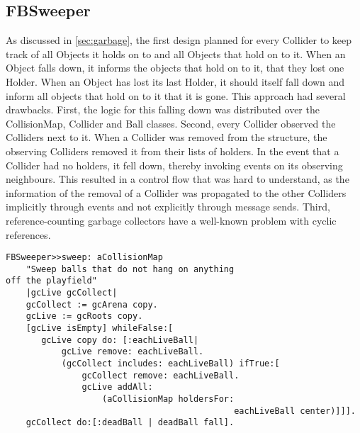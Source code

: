 \subsection{FBSweeper}
As discussed in \ref{sec:garbage}, the first design planned for every Collider to keep track of all Objects it holds on to and all Objects that hold on to it. When an Object falls down, it informs the objects that hold on to it, that they lost one Holder. When an Object has lost its last Holder, it should itself fall down and inform all objects that hold on to it that it is gone.
This approach had several drawbacks. First, the logic for this falling down was distributed over the CollisionMap, Collider and Ball classes.
Second, every Collider observed the Colliders next to it. When a Collider was removed from the structure, the observing Colliders removed it from their lists of holders. In the event that a Collider had no holders, it fell down, thereby invoking events on its observing neighbours.
This resulted in a control flow that was hard to understand, as the information of the removal of a Collider was propagated to the other Colliders implicitly through events and not explicitly through message sends.
Third, reference-counting garbage collectors have a well-known problem with cyclic references. 

\begin{lstlisting}[language=Smalltalk, label=lst:sweep, caption= mark-and-sweep ball collector]
FBSweeper>>sweep: aCollisionMap
    "Sweep balls that do not hang on anything 
off the playfield"
    |gcLive gcCollect|
    gcCollect := gcArena copy.
    gcLive := gcRoots copy.
    [gcLive isEmpty] whileFalse:[
       gcLive copy do: [:eachLiveBall|
           gcLive remove: eachLiveBall.
           (gcCollect includes: eachLiveBall) ifTrue:[
               gcCollect remove: eachLiveBall.
               gcLive addAll:
                   (aCollisionMap holdersFor: 
                                             eachLiveBall center)]]].
    gcCollect do:[:deadBall | deadBall fall].
\end{lstlisting}
